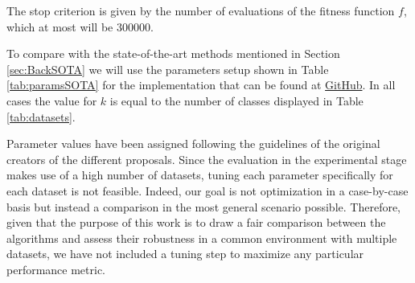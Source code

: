 \documentclass[review]{elsarticle}
\begin{document}
The stop criterion is given by the number of evaluations of the fitness function $f$, which at most will be 300000.

To compare with the state-of-the-art methods mentioned in Section \ref{sec:BackSOTA} we will use the parameters setup shown in Table \ref{tab:paramsSOTA} for the implementation that can be found at \href{https://github.com/GermangUgr/TFG/tree/master/Software}{GitHub}. In all cases the value for $k$ is equal to the number of classes displayed in Table \ref{tab:datasets}.

\begin{table}[!h]
	\centering
	\setlength{\tabcolsep}{7pt}
	\renewcommand{\arraystretch}{1.4}
		
	\caption{Parameters setup used for the state-of-the-art algorithms.}
	\label{tab:paramsSOTA}
\end{table}

Parameter values have been assigned following the guidelines of the original creators of the different proposals. Since the evaluation in the experimental stage makes use of a high number of datasets, tuning each parameter specifically for each dataset is not feasible. Indeed, our goal is not optimization in a case-by-case basis but instead a comparison in the most general scenario possible. Therefore, given that the purpose of this work is to draw a fair comparison between the algorithms and assess their robustness in a common environment with multiple datasets, we have not included a tuning step to maximize any particular performance metric.
\end{document}
